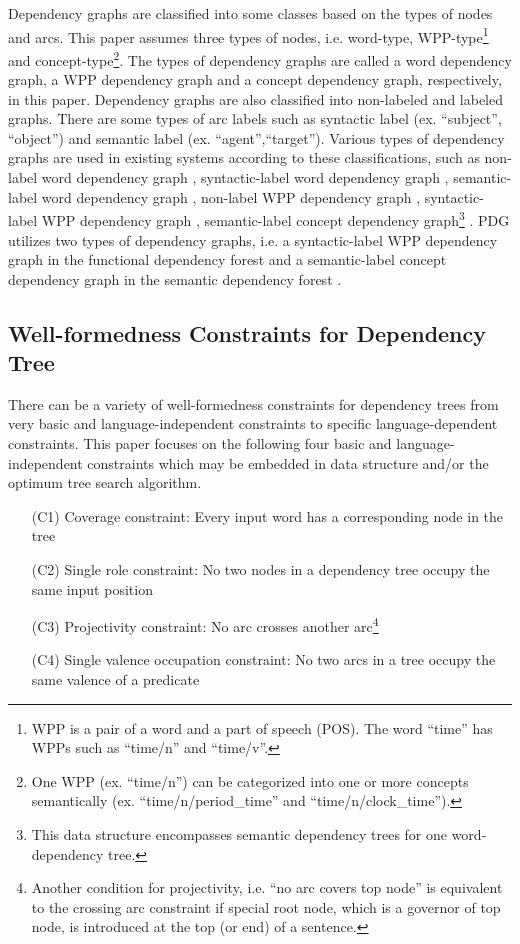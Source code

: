 Dependency graphs are classified into some classes based on the types
of nodes and arcs. This paper assumes three types of nodes,
i.e. word-type, WPP-type\footnote{WPP is a pair of a word and a part
of speech (POS). The word ``time'' has WPPs such as ``time/n'' and
``time/v''.} and concept-type\footnote{One WPP (ex. ``time/n'') can be categorized
into one or more concepts semantically (ex. ``time/n/period\_time''
and ``time/n/clock\_time'').}. The types of dependency graphs are
called a word dependency graph, a WPP dependency graph and a concept
dependency graph, respectively, in this paper. Dependency graphs are
also classified into non-labeled and labeled graphs. There are some
types of arc labels such as syntactic label (ex. ``subject'',
``object'') and semantic label (ex. ``agent'',``target''). Various
types of dependency graphs are used in existing systems according to
these classifications, such as non-label word dependency graph
\cite{Lee97,Eisner96,McDonald05}, syntactic-label word dependency
graph \cite{Maruyama90}, semantic-label word dependency graph
\cite{Hirakawa01}, non-label WPP dependency graph
\cite{Ozeki94,Kato_ehara89}, syntactic-label WPP dependency graph
\cite{Wang04}, semantic-label concept dependency graph\footnote{This data structure encompasses semantic dependency trees
for one word-dependency tree.} \cite{Harada01}. PDG utilizes two types of dependency
graphs, i.e. a syntactic-label WPP dependency graph in the functional dependency forest and a
semantic-label concept dependency graph in the semantic dependency
forest \cite{Hirakawa05a}. 

\subsection{Well-formedness Constraints for Dependency Tree}
\label{sec:WellFormednessConstraints}

There can be a variety of well-formedness constraints for dependency
trees from very basic and language-independent constraints to specific
language-dependent constraints. This paper focuses on the following four
basic and language-independent constraints which may be embedded in
data structure and/or the optimum tree search algorithm.


\begin{itemize}
\item [(C1)] Coverage constraint: Every input word has a corresponding node in the tree
\item [(C2)] Single role constraint: No two nodes in a dependency tree
occupy the same input position

\item [(C3)] Projectivity constraint: No arc crosses another arc\footnote{Another condition for projectivity, i.e. ``no arc covers top
node'' is equivalent to the crossing arc constraint if special root
node, which is a governor of top node, is introduced at the top (or
end) of a sentence.}

\item [(C4)] Single valence occupation constraint: No two arcs in a tree occupy the same valence of a predicate 
\end{itemize}

